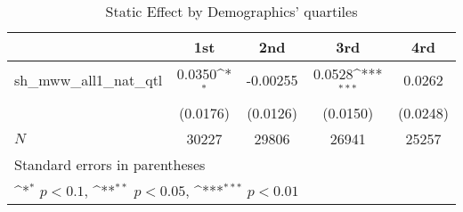 \begin{table}[htbp]\centering
\def\sym#1{\ifmmode^{#1}\else\(^{#1}\)\fi}
\caption{Static Effect by Demographics' quartiles}
\begin{tabular}{l*{4}{c}}
\hline\hline
            &\multicolumn{1}{c}{1st}&\multicolumn{1}{c}{2nd}&\multicolumn{1}{c}{3rd}&\multicolumn{1}{c}{4rd}\\
\hline
sh\_mww\_all1\_nat\_qtl&      0.0350\sym{*}  &    -0.00255         &      0.0528\sym{***}&      0.0262         \\
            &    (0.0176)         &    (0.0126)         &    (0.0150)         &    (0.0248)         \\
\hline
\(N\)       &       30227         &       29806         &       26941         &       25257         \\
\hline\hline
\multicolumn{5}{l}{\footnotesize Standard errors in parentheses}\\
\multicolumn{5}{l}{\footnotesize \sym{*} \(p<0.1\), \sym{**} \(p<0.05\), \sym{***} \(p<0.01\)}\\
\end{tabular}
\end{table}
